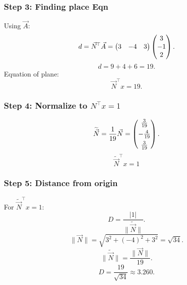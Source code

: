 \documentclass{beamer}
\begin{document}
\begin{frame}
\frametitle{Step 3: Finding place Eqn}
Using $\Vec{A}$:
\begin{equation}
d = \Vec{N}^{\!\top}\Vec{A}
= \begin{pmatrix}3 & -4 & 3\end{pmatrix}\begin{pmatrix}3\\-1\\2\end{pmatrix}.
\end{equation}
\pause
\begin{equation}
d = 9 + 4 + 6 = 19.
\end{equation}
\pause
Equation of plane:
\begin{equation}
\Vec{N}^{\!\top}x = 19.
\end{equation}
\end{frame}

\begin{frame}
\frametitle{Step 4: Normalize to $N^\top x = 1$}
\begin{equation}
\widetilde{\Vec{N}} = \frac{1}{19}\Vec{N}
= \begin{pmatrix}\tfrac{3}{19}\\[4pt]-\tfrac{4}{19}\\[4pt]\tfrac{3}{19}\end{pmatrix}.
\end{equation}
\pause
\begin{equation}
\boxed{\;\widetilde{\Vec{N}}^{\!\top} x = 1\;}
\end{equation}
\end{frame}

\begin{frame}
\frametitle{Step 5: Distance from origin}
For $\widetilde{\Vec{N}}^{\!\top}x = 1$:
\begin{equation}
D = \frac{|1|}{\|\widetilde{\Vec{N}}\|}.
\end{equation}
\pause
\begin{equation}
\|\Vec{N}\| = \sqrt{3^2+(-4)^2+3^2} = \sqrt{34}.
\end{equation}
\pause
\begin{equation}
\|\widetilde{\Vec{N}}\| = \frac{\|\Vec{N}\|}{19}.
\end{equation}
\pause
\begin{equation}
D = \frac{19}{\sqrt{34}} \approx 3.260.
\end{equation}
\end{frame}
\end{document}
